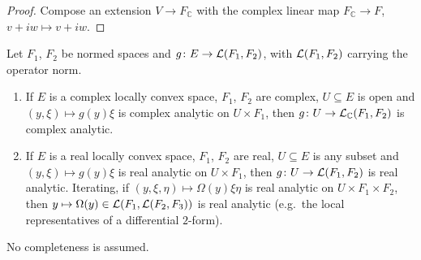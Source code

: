 \begin{proof}
  \leanok
  Compose an extension $V \to F_{\mathbb{C}}$ with the complex linear map
  $F_{\mathbb{C}} \to F$, $v + iw \mapsto v + iw$.
\end{proof}

\begin{theorem}
  \label{thm:analytic-operator-valued}
  \leanok
  Let $F_1$, $F_2$ be normed spaces and $g \colon E \to \mathcal{L}(F_1, F_2)$, with $\mathcal{L}(F_1, F_2)$
  carrying the operator norm.
  \begin{enumerate}
    \item If $E$ is a complex locally convex space, $F_1$, $F_2$ are complex, $U \subseteq E$ is
      open and $(y, \xi) \mapsto g(y)\xi$ is complex analytic on $U \times F_1$, then
      $g \colon U \to \mathcal{L}_{\mathbb{C}}(F_1, F_2)$ is complex analytic.
    \item If $E$ is a real locally convex space, $F_1$, $F_2$ are real, $U \subseteq E$ is any
      subset and $(y, \xi) \mapsto g(y)\xi$ is real analytic on $U \times F_1$, then
      $g \colon U \to \mathcal{L}(F_1, F_2)$ is real analytic. Iterating, if
      $(y, \xi, \eta) \mapsto \Omega(y)\xi\eta$ is real analytic on $U \times F_1 \times F_2$,
      then $y \mapsto \Omega(y) \in \mathcal{L}(F_1, \mathcal{L}(F_2, F_3))$ is real analytic (e.g.\ the local
      representatives of a differential $2$-form).
  \end{enumerate}
  No completeness is assumed.
\end{theorem}

